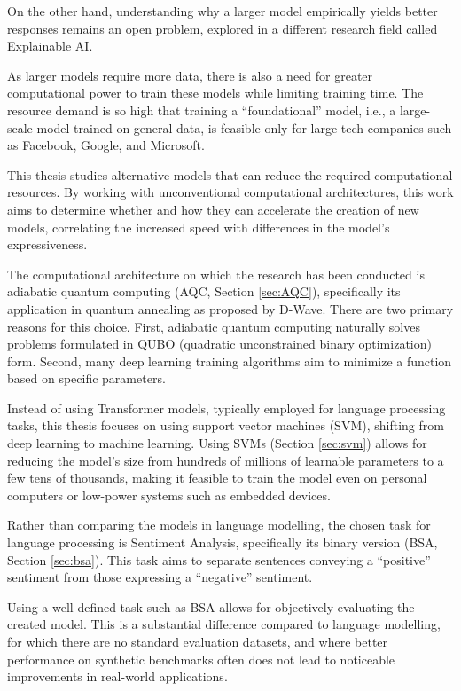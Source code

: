 On the other hand, understanding why a larger model empirically yields better responses remains an open problem, explored in a different research field called Explainable AI.

As larger models require more data, there is also a need for greater computational power to train these models while limiting training time.
The resource demand is so high that training a ``foundational'' model, i.e., a large-scale model trained on general data, is feasible only for large tech companies such as Facebook, Google, and Microsoft.

This thesis studies alternative models that can reduce the required computational resources.
By working with unconventional computational architectures, this work aims to determine whether and how they can accelerate the creation of new models, correlating the increased speed with differences in the model's expressiveness.

The computational architecture on which the research has been conducted is adiabatic quantum computing (AQC, Section \ref{sec:AQC}), specifically its application in quantum annealing as proposed by D-Wave.
There are two primary reasons for this choice. 
First, adiabatic quantum computing naturally solves problems formulated in QUBO (quadratic unconstrained binary optimization) form.
Second, many deep learning training algorithms aim to minimize a function based on specific parameters.

Instead of using Transformer models, typically employed for language processing tasks, this thesis focuses on using support vector machines (SVM), shifting from deep learning to machine learning. 
Using SVMs (Section \ref{sec:svm}) allows for reducing the model's size from hundreds of millions of learnable parameters to a few tens of thousands, making it feasible to train the model even on personal computers or low-power systems such as embedded devices.

Rather than comparing the models in language modelling, the chosen task for language processing is Sentiment Analysis, specifically its binary version (BSA, Section \ref{sec:bsa}).
This task aims to separate sentences conveying a ``positive'' sentiment from those expressing a ``negative'' sentiment.

Using a well-defined task such as BSA allows for objectively evaluating the created model.
This is a substantial difference compared to language modelling, for which there are no standard evaluation datasets, and where better performance on synthetic benchmarks often does not lead to noticeable improvements in real-world applications.

